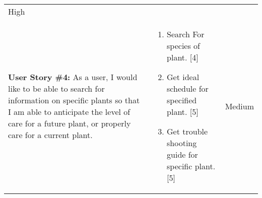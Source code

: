 \documentclass[portfolio.tex.tex]{subfiles}
\begin{document}
\begin{tabular}{p{6cm}|p{6cm}|p{4cm}}
						\vspace{-1cm}\color{red}High\\

						\textbf{User Story \#4:} As a user, I would like to be able to search for information on specific plants so that I am able to anticipate the level of care for a future plant, or properly care for a current plant.  &

						\vspace{-0.8cm}
						\begin{enumerate}
							\item  	Search For species of plant. [4]
							\item 	Get ideal schedule for specified plant. [5]
							\item 	Get trouble shooting guide for specific plant. [5]
						\end{enumerate}&

						\vspace{-1cm}\color{orange}Medium\\
					\end{tabular}
\end{document}
